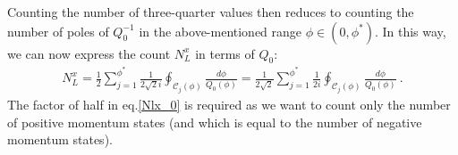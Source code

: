 Counting the number of three-quarter values then reduces to counting the number of poles of \(Q^{-1}_0\) in the above-mentioned range \(\phi \in \left( 0, \phi^* \right) \). In this way, we can now express the count \(N_L^x\) in terms of \(Q_0\):
\begin{equation}\begin{aligned}
	\label{Nlx_0}
	N_L^x = \frac{1}{2} \sum_{j=1}^{\phi^*}\frac{1}{2\sqrt 2i}\oint_{\mathcal{C}_j(\phi)} \frac{d\phi}{Q_0(\phi)} = \frac{1}{2\sqrt 2}\sum_{j=1}^{\phi^*}\frac{1}{2 i}\oint_{\mathcal{C}_j(\phi)} \frac{d\phi}{Q_0(\phi)}~.
\end{aligned}\end{equation}
The factor of half in eq.\eqref{Nlx_0} is required as we want to count only the number of positive momentum states (and which is equal to the number of negative momentum states).

